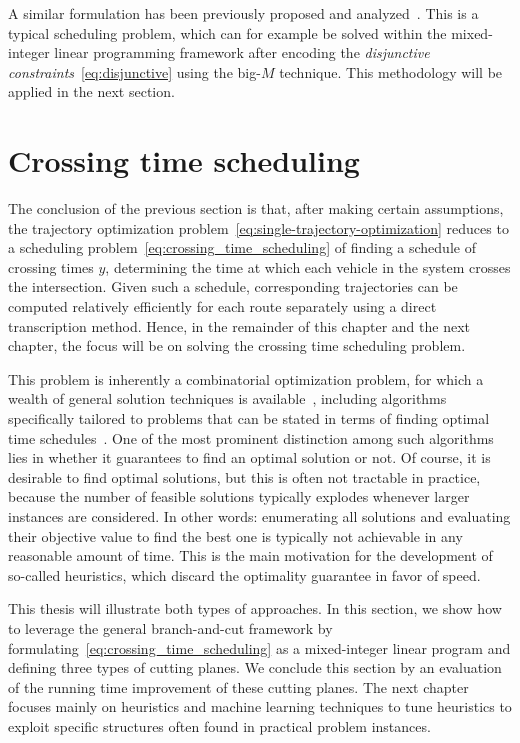 \documentclass[a4paper]{report}
\newcommand{\comment}[1]{\pdfmargincomment[author=Jeroen van Riel]{#1}}
\theoremstyle{definition}
\theoremstyle{plain}
\begin{document}
A similar formulation has been previously proposed and
analyzed~\cite{limpensOnlinePlatoonForming2023}. This is a typical scheduling
problem, which can for example be solved within the mixed-integer linear
programming framework after encoding the \textit{disjunctive constraints}~\eqref{eq:disjunctive} using the
big-$M$ technique. This methodology will be applied in the next section.


\section{Crossing time scheduling}\label{sec:crossing-time-scheduling}

The conclusion of the previous section is that, after making certain
assumptions, the trajectory optimization problem~\eqref{eq:single-trajectory-optimization} reduces to a scheduling
problem~\eqref{eq:crossing_time_scheduling} of finding a schedule of crossing times $y$, determining the time at
which each vehicle in the system crosses the intersection.
%
Given such a schedule, corresponding trajectories can be computed relatively
efficiently for each route separately using a direct transcription method.
%
Hence, in the remainder of this chapter and the next chapter, the focus will be
on solving the crossing time scheduling problem.

This problem is inherently a combinatorial optimization problem, for which a
wealth of general solution techniques is
available~\cite{duIntroductionCombinatorialOptimization2022}, including
algorithms specifically tailored to problems that can be stated in terms of
finding optimal time
schedules~\cite{pinedoSchedulingTheoryAlgorithms2016,grahamOptimizationApproximationDeterministic1979}.
%
One of the most prominent distinction among such algorithms lies in whether it
guarantees to find an optimal solution or not.
%
Of course, it is desirable to find optimal solutions, but this is often not
tractable in practice, because the number of feasible solutions typically
explodes whenever larger instances are considered.
%
In other words: enumerating all solutions and evaluating their objective value
to find the best one is typically not achievable in any reasonable amount of
time.
%
This is the main motivation for the development of so-called heuristics, which
discard the optimality guarantee in favor of speed.

This thesis will illustrate both types of approaches.
%
In this section, we show how to leverage the general branch-and-cut framework by
formulating~\eqref{eq:crossing_time_scheduling} as a mixed-integer linear
program and defining three types of cutting planes.
%
We conclude this section by an evaluation of the running time improvement of
these cutting planes. \comment{Clearly motivate why we want fast heuristics.}
%
The next chapter focuses mainly on heuristics and machine learning techniques to
tune heuristics to exploit specific structures often found in practical problem
instances.
\end{document}

